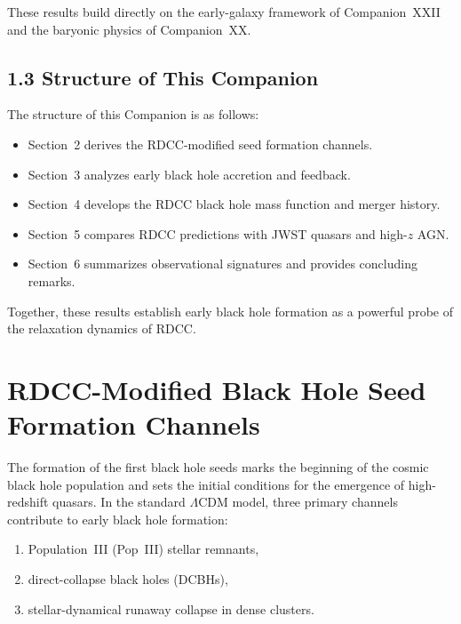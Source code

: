 \documentclass[11pt,a4paper]{article}
\begin{document}
These results build directly on the early-galaxy framework of Companion~XXII and the baryonic 
physics of Companion~XX.

\subsection*{1.3 Structure of This Companion}

The structure of this Companion is as follows:

\begin{itemize}
    \item Section~2 derives the RDCC-modified seed formation channels.
    \item Section~3 analyzes early black hole accretion and feedback.
    \item Section~4 develops the RDCC black hole mass function and merger history.
    \item Section~5 compares RDCC predictions with JWST quasars and high-$z$ AGN.
    \item Section~6 summarizes observational signatures and provides concluding remarks.
\end{itemize}

Together, these results establish early black hole formation as a powerful probe of the 
relaxation dynamics of RDCC.

\section{RDCC-Modified Black Hole Seed Formation Channels}

The formation of the first black hole seeds marks the beginning of the cosmic black hole 
population and sets the initial conditions for the emergence of high-redshift quasars. In the 
standard $\Lambda$CDM model, three primary channels contribute to early black hole formation:

\begin{enumerate}
    \item Population~III (Pop~III) stellar remnants,
    \item direct-collapse black holes (DCBHs),
    \item stellar-dynamical runaway collapse in dense clusters.
\end{enumerate}
\end{document}
